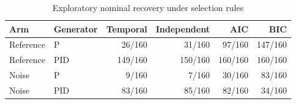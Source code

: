 \begin{table}[htbp]
\centering
\caption{Exploratory nominal recovery under selection rules}
\label{tab:m02-robustness-selection}
\begin{tabular}{llrrrr}
\toprule
Arm & Generator & Temporal & Independent & AIC & BIC \\
\midrule
Reference & P & 26/160 & 31/160 & 97/160 & 147/160 \\
Reference & PID & 149/160 & 150/160 & 160/160 & 160/160 \\
Noise & P & 9/160 & 7/160 & 30/160 & 83/160 \\
Noise & PID & 83/160 & 85/160 & 82/160 & 34/160 \\
\bottomrule
\end{tabular}
\end{table}
